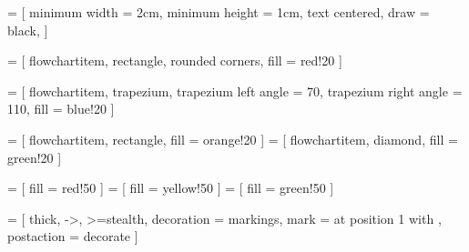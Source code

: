 \usepackage{tikz}
\usepackage{tkz-euclide}
\usetikzlibrary{shapes.geometric, arrows}
\usepackage{tikz-qtree}


 = [
	minimum width = 2cm,
	minimum height = 1cm,
	text centered,
	draw = black,
]

 = [
	flowchartitem,
	rectangle,
	rounded corners,
	fill = red!20
]
 
 = [
	flowchartitem,
	trapezium,
	trapezium left angle = 70,
	trapezium right angle = 110,
	fill = blue!20
]

 = [
	flowchartitem,
	rectangle,
	fill = orange!20
]
 = [
	flowchartitem,
	diamond,
	fill = green!20
]

 = [ fill = red!50 ]
 = [ fill = yellow!50 ]
 = [ fill = green!50 ]

\newenvironment*{tikzfigure}[1][]{
	\begin{figure}[h!]
	\begin{tikzfigureinternal}[#1]
}{
	\end{tikzfigureinternal}
	\end{figure}
}

\newenvironment*{tikzsubfigure}[1][]{
	\begin{subfigure}[b]{0.45\textwidth}
	\begin{tikzfigureinternal}[#1]
}{
	\end{tikzfigureinternal}
	\end{subfigure}
}

\newenvironment*{tikzfigureinternal}[1][]{
	\centering
	\gdef\tcapt{#1}
	\begin{tikzpicture}[scale=1]
}{
	\end{tikzpicture}
	\caption{\tcapt}
}

 = [
	thick,
	->,
	>=stealth,
	decoration = {
		markings,
		mark = at position 1 with {
			\arrow[scale=2]{>}
		}
	},
	postaction = {decorate}
]

\newenvironment*{flowchart}[2]{
	\label{#1}
	\begin{tikzfigure}[#2]
	\tikzset {
		level distance = 3cm,
		grow = down,
		edge from parent/.append style = { flowchartArrow }
	}
}{
	\end{tikzfigure}
}
